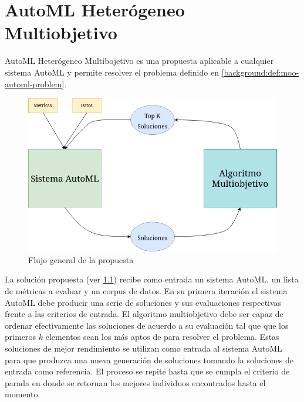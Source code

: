
\chapter{AutoML Heter\'ogeneo Multiobjetivo}\label{chapter:proposal}

AutoML Heter\'ogeneo Multibojetivo es una propuesta aplicable a cualquier sistema AutoML y permite resolver el problema definido en \ref{background:def:moo-automl-problem}.

\begin{figure}[ht]
    \centering
    \includegraphics[scale=0.5]{Pictures/automl_moo_proposal.png}
    \caption{Flujo general de la propuesta}
    \label{proposal:fig:flux}
\end{figure}

La soluci\'on propuesta (ver \ref{proposal:fig:flux}) recibe como entrada un sistema AutoML, un lista de m\'etricas a evaluar y un corpus de datos. En su primera iteraci\'on el sistema AutoML debe producir una serie de soluciones y sus evaluaciones respectivas frente a las criterios de entrada. El algoritmo multiobjetivo debe ser capaz de ordenar efectivamente las soluciones de acuerdo a su evaluaci\'on tal que que los primeros $k$ elementos sean los m\'as aptos de para resolver el problema. Estas soluciones de mejor rendimiento se utilizan como entrada al sistema AutoML para que produzca una nueva generaci\'on de soluciones tomando la soluciones de entrada como referencia. El proceso se repite hasta que se cumpla el criterio de parada en donde se retornan los mejores individuos encontrados hasta el momento.

